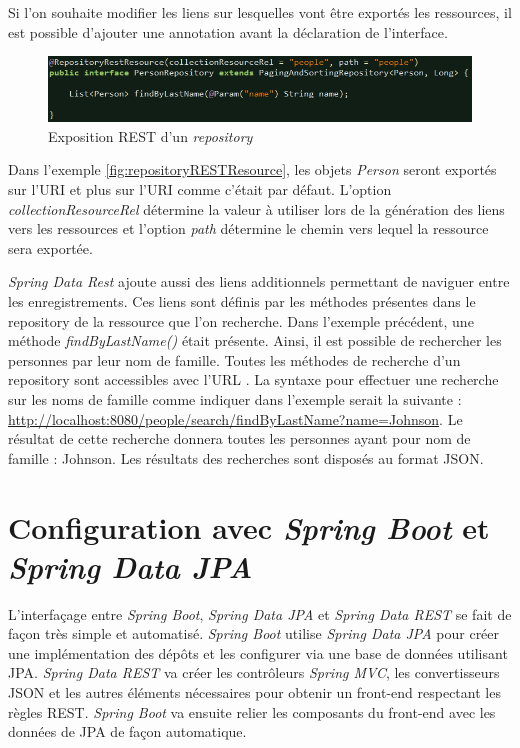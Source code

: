 \documentclass{polytech/polytech}
\begin{document}
Si l’on souhaite modifier les liens sur lesquelles vont être exportés les ressources, il est possible d’ajouter une annotation  avant la déclaration de l’interface.

\begin{figure}
	\includegraphics[scale=0.75]{images/repositoryRESTResource}
	\caption{Exposition REST d'un \textit{repository}}
	\label{fig:repositoryRESTResource}
\end{figure}

Dans l’exemple \autoref{fig:repositoryRESTResource}, les objets \textit{Person} seront exportés sur l’URI  et plus sur l’URI  comme c’était par défaut. L’option \textit{collectionResourceRel} détermine la valeur à utiliser lors de la génération des liens vers les ressources et l’option \textit{path} détermine le chemin vers lequel la ressource sera exportée. 

\textit{Spring Data Rest} ajoute aussi des liens additionnels permettant de naviguer entre les enregistrements. Ces liens sont définis par les méthodes présentes dans le repository de la ressource que l’on recherche. Dans l’exemple précédent, une méthode \textit{findByLastName()} était présente. Ainsi, il est possible de rechercher les personnes par leur nom de famille. Toutes les méthodes de recherche d’un repository sont accessibles avec l’URL . La syntaxe pour effectuer une recherche sur les noms de famille comme indiquer dans l’exemple serait la suivante : \url{http://localhost:8080/people/search/findByLastName?name=Johnson}. Le résultat de cette recherche donnera toutes les personnes ayant pour nom de famille : Johnson. Les résultats des recherches sont disposés au format JSON. 

\section{Configuration avec \textit{Spring Boot} et \textit{Spring Data JPA}}

L’interfaçage entre \textit{Spring Boot}, \textit{Spring Data JPA} et \textit{Spring Data REST} se fait de façon très simple et automatisé. \textit{Spring Boot} utilise \textit{Spring Data JPA} pour créer une implémentation des dépôts et les configurer via une base de données utilisant JPA. \textit{Spring Data REST} va créer les contrôleurs \textit{Spring MVC}, les convertisseurs JSON et les autres éléments nécessaires pour obtenir un front-end respectant les règles REST. \textit{Spring Boot} va ensuite relier les composants du front-end avec les données de JPA de façon automatique. 
\end{document}
